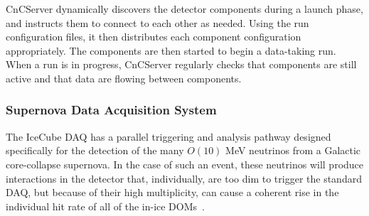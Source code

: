 CnCServer dynamically discovers the detector components during a launch
phase, and instructs them to connect to each other as needed.  Using the
run configuration files, it then distributes each component configuration
appropriately.  The components are then started to begin a data-taking run.
When a run is in progress, CnCServer regularly checks that components are
still active and that data are flowing between components.




\subsubsection{\label{sect:SNDAQ}Supernova Data Acquisition System}

The IceCube DAQ has a parallel triggering and analysis pathway designed
specifically for the detection of the many $O(10)$ MeV neutrinos from a
Galactic core-collapse supernova.  In the case of such an event, these
neutrinos will produce interactions in
the detector that, individually, are too dim to trigger the standard DAQ,
but because of their high multiplicity, can cause a coherent rise in the
individual hit rate of all of the in-ice DOMs~\cite{IC3:supernova}.

